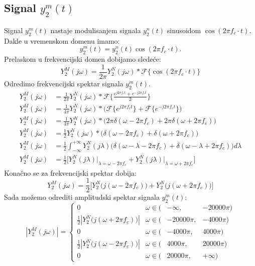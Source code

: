 \documentclass[titlepage,a4paper,12pt]{article}
\begin{document}
	\subsection{Signal $y_2^m(t)$}
	Signal $y_2^m(t)$ nastaje modulisanjem signala $y_2^n(t)$ sinusoidom $\cos(2\pi f_c\cdot t)$. Dakle u vremenskom domenu imamo:
	\begin{equation}
		y_2^m(t) = y_2^n(t)\cos(2\pi f_c\cdot t).
	\end{equation}
	Prelaskom u frekvencijski domen dobijamo sledeće:
	\begin{equation}
		Y_2^M(j\omega) = \frac{1}{2\pi} Y_2^N(j\omega)*\mathcal{F}\big\{\cos(2\pi f_c\cdot t)\big\}
	\end{equation}
	Odredimo frekvencijski spektar signala $y_2^m(t)$.
	\begin{align*}
		Y_2^M(j\omega) &= \frac{1}{2\pi} Y_2^N(j\omega)*\mathcal{F}\Bigg\{ \frac{e^{j2\pi f_c t}+e^{-j2\pi f_c t}}{2} \Bigg\}\\
		Y_2^M(j\omega) &= \frac{1}{4\pi} Y_2^N(j\omega)*\Bigg(\mathcal{F}\big\{e^{j2\pi f_c t} \big\}
		+\mathcal{F}\big\{e^{-j2\pi f_c t} \big\}\Bigg)\\
		Y_2^M(j\omega) &= \frac{1}{4\pi}Y_2^N(j\omega)*\Big( 2\pi\delta(\omega-2\pi f_c) + 2\pi\delta(\omega+2\pi f_c)\Big)\\
		Y_2^M(j\omega) &= \frac{1}{2}Y_2^N(j\omega)*\Big(\delta(\omega-2\pi f_c) + \delta(\omega+2\pi f_c)\Big)\\
		Y_2^M(j\omega) &= \frac{1}{2}\int_{-\infty}^{+\infty}Y_2^N(j\lambda)\Big(\delta(\omega-\lambda-2\pi f_c) + \delta(\omega-\lambda+2\pi f_c)\Big)d\lambda\\
		Y_2^M(j\omega) &= \frac{1}{2}\Bigg[Y_2^N(j\lambda)\Big|_{\lambda = \omega - 2\pi f_c} + Y_2^N(j\lambda)\Big|_{\lambda = \omega + 2\pi f_c}\Bigg]
	\end{align*}
	Konačno se za frekvencijski spektar dobija:
	\begin{equation}
		Y_2^M(j\omega) = \frac{1}{2}\Big[Y_2^N\big(j(\omega - 2\pi f_c)\big) + Y_2^N\big(j(\omega + 2\pi f_c)\big)\Big]
	\end{equation}
	Sada možemo odrediti amplitudski spektar signala $y_2^m(t)$:
	\begin{equation}
		|Y_2^M(j\omega)| = \left\{
		\begin{array}{clrrl}
			0& \omega \in (&-\infty,& -20000\pi) \\
			\frac{1}{2}|Y_2^N\big(j(\omega+2\pi f_c)\big)|& \omega \in (&-20000\pi,& -4000\pi) \\
			0& \omega \in (&-4000\pi,& 4000\pi) \\
			\frac{1}{2}|Y_2^N\big(j(\omega-2\pi f_c)\big)|& \omega \in (&4000\pi,& 20000\pi) \\
			0& \omega \in (&20000\pi,& +\infty)
		\end{array}\right.
	\end{equation}
\end{document}
